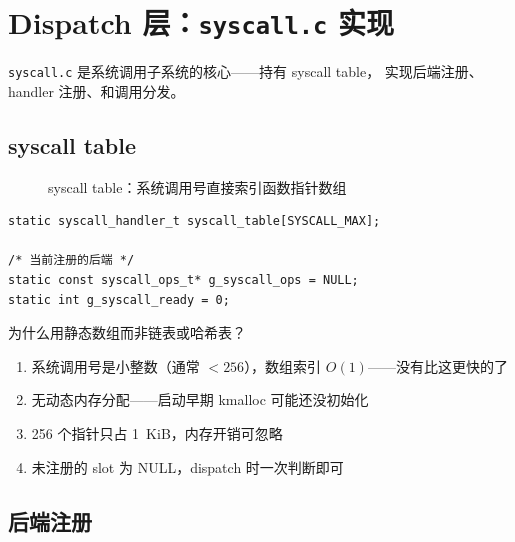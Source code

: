 \section{Dispatch 层：\texttt{syscall.c} 实现}
\label{sec:syscall-dispatch}

\texttt{syscall.c} 是系统调用子系统的核心——持有 syscall table，
实现后端注册、handler 注册、和调用分发。

\subsection{syscall table}

\begin{figure}[H]
  \centering
  
  \caption{syscall table：系统调用号直接索引函数指针数组}
  \label{fig:syscall-table}
\end{figure}

\begin{lstlisting}[style=cstyle]
static syscall_handler_t syscall_table[SYSCALL_MAX];

/* 当前注册的后端 */
static const syscall_ops_t* g_syscall_ops = NULL;
static int g_syscall_ready = 0;
\end{lstlisting}

\begin{whybox}
为什么用静态数组而非链表或哈希表？
\begin{enumerate}
  \item 系统调用号是小整数（通常 $< 256$），数组索引 \textbf{$O(1)$}——没有比这更快的了
  \item 无动态内存分配——启动早期 kmalloc 可能还没初始化
  \item 256 个指针只占 1~KiB，内存开销可忽略
  \item 未注册的 slot 为 NULL，dispatch 时一次判断即可
\end{enumerate}
\end{whybox}

\subsection{后端注册}

